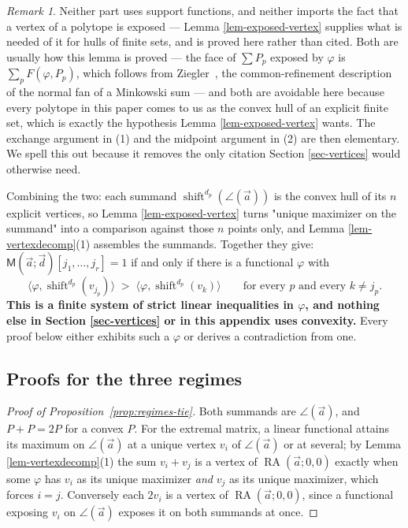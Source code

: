 \documentclass[11pt, a4paper, abstract=yes]{scrartcl}
\theoremstyle{definition}
\theoremstyle{remark}
\newtheorem{remark}[definition]{Remark}
\theoremstyle{plain}
\newcommand{\shift}{\operatorname{shift}}
\newcommand{\rasimp}{\angle}
\newcommand{\RA}{\operatorname{RA}}
\newcommand{\extten}{\mathsf{M}}
\begin{document}
\begin{remark}
Neither part uses support functions, and neither imports the fact that a vertex of a polytope is
exposed --- Lemma \ref{lem-exposed-vertex} supplies what is needed of it for hulls of finite sets, and
is proved here rather than cited. Both are usually how this lemma is proved --- the face of \(\sum P_p\) exposed by
\(\varphi\) is \(\sum_pF(\varphi,P_p)\), which follows from Ziegler~\cite[Proposition 7.12]{Ziegler1995},
the common-refinement description of the normal fan of a Minkowski sum --- and both
are avoidable here because every polytope in this paper comes to us as the convex hull of an
explicit finite set, which is exactly the hypothesis Lemma \ref{lem-exposed-vertex} wants. The
exchange argument in (1) and the midpoint argument in (2) are then elementary. We spell this out
because it removes the only citation Section \ref{sec-vertices} would otherwise need.
\label{rem-no-support-functions}
\end{remark}

Combining the two: each summand \(\shift^{d_p}(\rasimp(\vec a))\) is the convex hull of its \(n\)
explicit vertices, so Lemma \ref{lem-exposed-vertex} turns "unique maximizer on the summand" into a
comparison against those \(n\) points only, and Lemma \ref{lem-vertexdecomp}(1) assembles the summands.
Together they give: \(\extten(\vec a;\vec d)[j_1,\dots,j_r]=1\) if and only if there is a
functional \(\varphi\) with
\begin{equation}\label{eq:no-support-functions}
  \bigl\langle\varphi,\shift^{d_p}(v_{j_p})\bigr\rangle
  \;>\;\bigl\langle\varphi,\shift^{d_p}(v_{k})\bigr\rangle
  \qquad\text{for every }p\text{ and every }k\ne j_p .
\end{equation}
\textbf{This is a finite system of strict linear inequalities in \(\varphi\), and nothing else in
Section \ref{sec-vertices} or in this appendix uses convexity.} Every proof below either exhibits
such a \(\varphi\) or derives a
contradiction from one.
\subsection{Proofs for the three regimes}
\label{sec-app-regimes}
\begin{proof}[Proof of Proposition~\ref{prop:regimes-tie}]
Both summands are \(\rasimp(\vec a)\), and \(P+P=2P\) for a convex \(P\). For the extremal matrix,
a linear functional attains its maximum on \(\rasimp(\vec a)\) at a unique vertex \(v_i\) of
\(\rasimp(\vec a)\) or at
several; by Lemma \ref{lem-vertexdecomp}(1) the sum \(v_i+v_j\) is a vertex of \(\RA(\vec a;0,0)\)
exactly when some \(\varphi\)
has \(v_i\) as its unique maximizer \emph{and} \(v_j\) as its unique maximizer, which forces \(i=j\).
Conversely each \(2v_i\) is a vertex of \(\RA(\vec a;0,0)\), since a functional exposing \(v_i\) on
\(\rasimp(\vec a)\) exposes it on both summands at once.
\end{proof}
\end{document}

